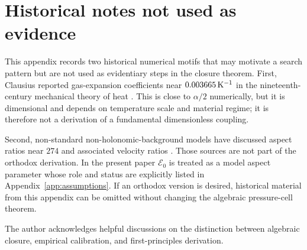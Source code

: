 \documentclass[aps,pra,preprint,longbibliography,nofootinbib]{revtex4-2}
\begin{document}
\section{Historical notes not used as evidence}
\label{app:history}

This appendix records two historical numerical motifs that may motivate a
search pattern but are not used as evidentiary steps in the closure theorem.
First, Clausius reported gas-expansion coefficients near
$0.003665\,{\rm K}^{-1}$ in the nineteenth-century mechanical theory of heat
\cite{Clausius1867}.  This is close to $\alpha/2$ numerically, but it is
dimensional and depends on temperature scale and material regime; it is
therefore not a derivation of a fundamental dimensionless coupling.

Second, non-standard non-holonomic-background models have discussed aspect
ratios near $274$ and associated velocity ratios
\cite{RabounskiBorissova2007,OrosDiBartini2005}.  Those sources are not part
of the orthodox derivation.  In the present paper $\mathcal E_0$ is treated
as a model aspect parameter whose role and status are explicitly listed in
Appendix~\ref{app:assumptions}.  If an orthodox version is desired,
historical material from this appendix can be omitted without changing the
algebraic pressure-cell theorem.

\begin{acknowledgments}
The author acknowledges helpful discussions on the distinction between
algebraic closure, empirical calibration, and first-principles
derivation.
\end{acknowledgments}
\end{document}
